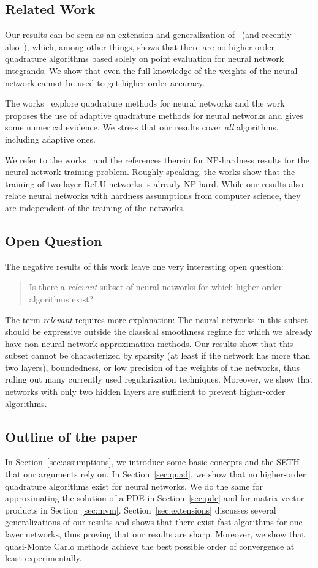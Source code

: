 \documentclass{amsart}[11pt]
\numberwithin{equation}{section}
\numberwithin{theorem}{section}
\begin{document}
\subsection{Related Work}
Our results can be seen as an extension and generalization of~\cite{t2p} (and recently also~\cite{grohs2025theorytopracticegapneuralnetworks}), which, among other things, shows that there are no higher-order quadrature algorithms based solely on point evaluation for neural network integrands. We show that even the full knowledge of the weights of the neural network cannot be used to get higher-order accuracy.

The works~\cite{liu2024neuralnetworksintegrable,RIVERA2022114710} explore quadrature methods for neural networks and the work~\cite{adaptivequad} proposes the use of adaptive quadrature methods for neural networks and gives some numerical evidence. We stress that our results cover \emph{all} algorithms, including adaptive ones.

We refer to the works~\cite{nphard,np1,np2} and the references therein for NP-hardness results for the neural network training problem. Roughly speaking, the works show that the training of two layer ReLU networks is already NP hard. While our results also relate neural networks with hardness assumptions from computer science, they are independent of the training of the networks.

\subsection{Open Question}
The negative results of this work leave one very interesting open question: 
\begin{quote}
Is there a \emph{relevant} subset of neural networks for which higher-order algorithms exist?
\end{quote}
The term \emph{relevant} requires more explanation: The neural networks in this subset should be expressive outside the classical smoothness regime for which we already have non-neural network approximation methods. Our results show that this subset cannot be characterized by sparsity (at least if the network has more than two layers), boundedness, or low precision of the weights of the networks, thus ruling out many currently used regularization techniques. Moreover,
we show that networks with only two hidden layers are sufficient to prevent higher-order algorithms.
\subsection{Outline of the paper}
In Section~\ref{sec:assumptions}, we introduce some basic concepts and the SETH that our arguments rely on.
In Section~\ref{sec:quad}, we show that no higher-order quadrature algorithms exist for neural networks. We do the same for approximating the solution of a PDE in Section~\ref{sec:pde} and for matrix-vector products in Section~\ref{sec:mvm}. Section~\ref{sec:extensions} discusses several generalizations of our results and shows that there exist fast algorithms for one-layer networks, thus proving that our results are sharp. Moreover, we show that quasi-Monte Carlo methods achieve the best possible order of convergence at least experimentally.
\end{document}
